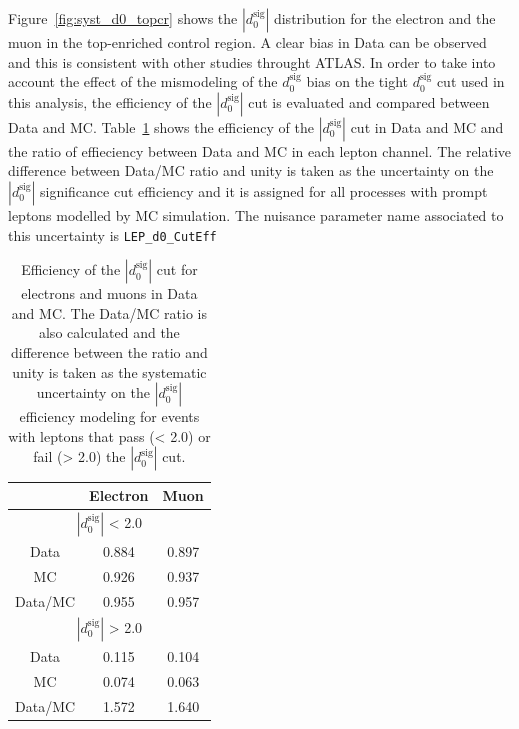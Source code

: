 Figure~\ref{fig:syst_d0_topcr} shows the $|d_{0}^{\textrm{sig}}|$ distribution for the electron and the muon in the top-enriched control region. A clear bias
in Data can be observed and this is consistent with other studies throught ATLAS. In order to take into account the effect of the mismodeling of the $d_{0}^{\textrm{sig}}$
bias on the tight $d_{0}^{\textrm{sig}}$ cut used in this analysis, the efficiency of the $|d_{0}^{\textrm{sig}}|$ cut is evaluated and compared between Data and MC.
Table~\ref{tab:syst_d0_topcr_eff_datamc} shows the efficiency of the $|d_{0}^{\textrm{sig}}|$ cut in Data and MC and the ratio of effieciency between Data and MC in each
lepton channel. The relative difference between Data/MC ratio and unity is taken as the uncertainty on the $|d_{0}^{\textrm{sig}}|$ significance cut efficiency
and it is assigned for all processes with prompt leptons modelled by MC simulation. The nuisance parameter name associated to this uncertainty is \texttt{LEP\_d0\_CutEff}
 
\begin{table}[!htbp]
\begin{center}
\begin{tabular}{c|c|c}
&  Electron  & Muon  \\  
\hline
\multicolumn{3}{c}{$|d_{0}^{\textrm{sig}}|$ < 2.0} \\
\hline
Data                &  0.884  & 0.897 \\
MC                  &  0.926  & 0.937 \\
\hline
Data/MC             &  0.955  & 0.957 \\
\hline
\hline
\multicolumn{3}{c}{$|d_{0}^{\textrm{sig}}|$ > 2.0} \\
\hline
Data                &  0.115  & 0.104  \\
MC                  &  0.074  & 0.063  \\
\hline
Data/MC             &  1.572  & 1.640  \\
\end{tabular}
\end{center}
\caption{Efficiency of the $|d_{0}^{\textrm{sig}}|$ cut for electrons and muons in Data
and MC. The Data/MC ratio is also calculated and the difference between the ratio and unity
is taken as the systematic uncertainty on the $|d_{0}^{\textrm{sig}}|$ efficiency modeling
for events with leptons that pass (< 2.0) or fail (> 2.0) the $|d_{0}^{\textrm{sig}}|$ cut.}
\label{tab:syst_d0_topcr_eff_datamc}
\end{table}
 
